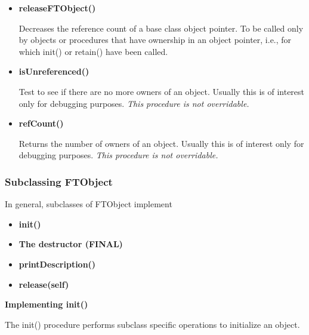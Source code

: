 \documentclass[9pt]{article}
\begin{document}
\begin{itemize}
\item {\bf releaseFTObject()}

      Decreases the reference count of a base class object pointer. To be called only by objects or procedures
      that have ownership in an object pointer, i.e., for which init() or retain() have been called.

\item {\bf isUnreferenced()}

      Test to see if there are no more owners of an object. Usually this is of interest only for debugging purposes. \emph{This procedure is not overridable.}

\item {\bf refCount()}

      Returns the number of owners of an object. Usually this is of interest only for debugging purposes.
      \emph{This procedure is not overridable.}
\end{itemize}

 \subsubsection{Subclassing FTObject}

 In general, subclasses of FTObject implement
\begin{itemize}
\item {\bf init()}
\item {\bf The destructor (FINAL)}
\item {\bf printDescription()}
\item {\bf release(self)}
\end{itemize}
 
%
%         
%               
%         


{\bf Implementing init() }

 The init() procedure performs subclass specific operations to initialize an object.
\end{document}
